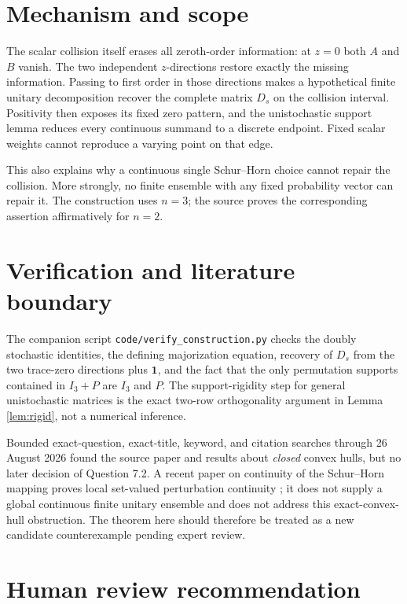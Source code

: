 \documentclass[11pt]{article}
\newcommand{\one}{\mathbf 1}
\begin{document}
\section{Mechanism and scope}

The scalar collision itself erases all zeroth-order information: at $z=0$
both $A$ and $B$ vanish.  The two independent $z$-directions restore exactly
the missing information.  Passing to first order in those directions makes a
hypothetical finite unitary decomposition recover the complete matrix $D_s$
on the collision interval.  Positivity then exposes its fixed zero pattern,
and the unistochastic support lemma reduces every continuous summand to a
discrete endpoint.  Fixed scalar weights cannot reproduce a varying point on
that edge.

This also explains why a continuous single Schur--Horn choice cannot repair
the collision.  More strongly, no finite ensemble with any fixed probability
vector can repair it.  The construction uses $n=3$; the source proves the
corresponding assertion affirmatively for $n=2$.

\section{Verification and literature boundary}

The companion script \texttt{code/verify\_construction.py} checks the
doubly stochastic identities, the defining majorization equation, recovery
of $D_s$ from the two trace-zero directions plus $\one$, and the fact that
the only permutation supports contained in $I_3+P$ are $I_3$ and $P$.
The support-rigidity step for general unistochastic matrices is the exact
two-row orthogonality argument in Lemma \ref{lem:rigid}, not a numerical
inference.

Bounded exact-question, exact-title, keyword, and citation searches through
26 August 2026 found the source paper and results about \emph{closed} convex
hulls, but no later decision of Question 7.2.  A recent paper on continuity of
the Schur--Horn mapping proves local set-valued perturbation continuity
\cite{CL}; it does not supply a global continuous finite unitary ensemble and
does not address this exact-convex-hull obstruction.  The theorem here should
therefore be treated as a new candidate counterexample pending expert review.

\section{Human review recommendation}
\end{document}
